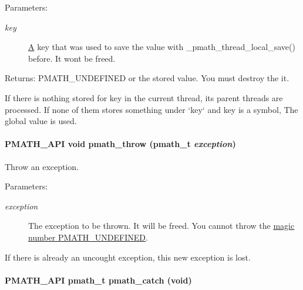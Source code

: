 \begin{Desc}
\item[Parameters:]
\begin{description}
\item[{\em key}]\hyperlink{class_a}{A} key that was used to save the value with \_\-pmath\_\-thread\_\-local\_\-save() before. It wont be freed. \end{description}
\end{Desc}
\begin{Desc}
\item[Returns:]PMATH\_\-UNDEFINED or the stored value. You must destroy the it.\end{Desc}
If there is nothing stored for key in the current thread, its parent threads are processed. If none of them stores something under `key` and key is a symbol, The global value is used. \hypertarget{group__threads_gf1aa6d6603faaa4120207be6108e356c}{
\paragraph[{pmath\_\-throw}]{\setlength{\rightskip}{0pt plus 5cm}PMATH\_\-API void pmath\_\-throw ({\bf pmath\_\-t} {\em exception})}\hfill}
\label{group__threads_gf1aa6d6603faaa4120207be6108e356c}


Throw an exception. 

\begin{Desc}
\item[Parameters:]
\begin{description}
\item[{\em exception}]The exception to be thrown. It will be freed. You cannot throw the \hyperlink{group__objects_ge2646df76dcb0113715322b13a1f36f0}{magic number PMATH\_\-UNDEFINED}.\end{description}
\end{Desc}
If there is already an uncought exception, this new exception is lost. \hypertarget{group__threads_gf791e0088342297d6511a4481421f446}{
\paragraph[{pmath\_\-catch}]{\setlength{\rightskip}{0pt plus 5cm}PMATH\_\-API {\bf pmath\_\-t} pmath\_\-catch (void)}\hfill}
\label{group__threads_gf791e0088342297d6511a4481421f446}



